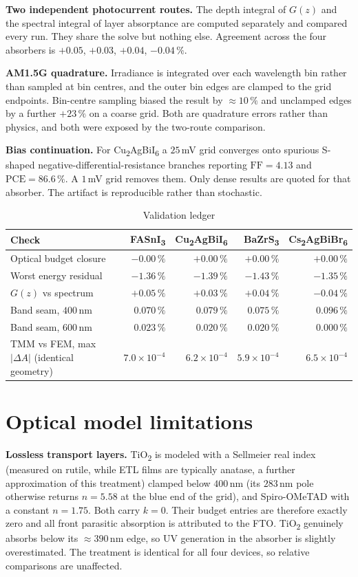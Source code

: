 \documentclass[lettersize,journal,onecolumn]{IEEEtran}
\newcommand{\FASnI}{FASnI\textsubscript{3}}
\newcommand{\CABI}{Cu\textsubscript{2}AgBiI\textsubscript{6}}
\newcommand{\BZS}{BaZrS\textsubscript{3}}
\newcommand{\CABB}{Cs\textsubscript{2}AgBiBr\textsubscript{6}}
\newcommand{\TiOx}{TiO\textsubscript{2}}
\begin{document}
\textbf{Two independent photocurrent routes.} The depth integral of $G(z)$ and
the spectral integral of layer absorptance are computed separately and
compared every run. They share the solve but nothing else. Agreement across
the four absorbers is $+0.05$, $+0.03$, $+0.04$, $-0.04\,\%$.

\textbf{AM1.5G quadrature.} Irradiance is integrated over each wavelength bin
rather than sampled at bin centres, and the outer bin edges are clamped to the
grid endpoints. Bin-centre sampling biased the result by $\approx10\,\%$ and
unclamped edges by a further $+23\,\%$ on a coarse grid. Both are quadrature
errors rather than physics, and both were exposed by the two-route comparison.

\textbf{Bias continuation.} For \CABI{} a $25\,$mV grid converges onto spurious
S-shaped negative-differential-resistance branches reporting $\mathrm{FF}=4.13$
and $\mathrm{PCE}=86.6\,\%$. A $1\,$mV grid removes them. Only dense results
are quoted for that absorber. The artifact is reproducible rather than
stochastic.

\begin{table}[!ht]
\caption{Validation ledger}
\centering\small
\begin{tabular}{lrrrr}
\toprule
Check & \FASnI & \CABI & \BZS & \CABB \\
\midrule
Optical budget closure       & $-0.00\,\%$ & $+0.00\,\%$ & $+0.00\,\%$ & $+0.00\,\%$ \\
Worst energy residual        & $-1.36\,\%$ & $-1.39\,\%$ & $-1.43\,\%$ & $-1.35\,\%$ \\
$G(z)$ vs spectrum           & $+0.05\,\%$ & $+0.03\,\%$ & $+0.04\,\%$ & $-0.04\,\%$ \\
Band seam, $400\,$nm         & $0.070\,\%$ & $0.079\,\%$ & $0.075\,\%$ & $0.096\,\%$ \\
Band seam, $600\,$nm         & $0.023\,\%$ & $0.020\,\%$ & $0.020\,\%$ & $0.000\,\%$ \\
TMM vs FEM, max $|\Delta A|$ (identical geometry) & $7.0\times10^{-4}$ & $6.2\times10^{-4}$ & $5.9\times10^{-4}$ & $6.5\times10^{-4}$ \\
\bottomrule
\end{tabular}
\end{table}

\section{Optical model limitations}
\textbf{Lossless transport layers.} \TiOx{} is modeled with a Sellmeier real
index (measured on rutile, while ETL films are typically anatase, a further
approximation of this treatment) clamped below $400\,$nm (its $283\,$nm pole otherwise returns $n=5.58$
at the blue end of the grid), and Spiro-OMeTAD with a constant $n=1.75$. Both
carry $k=0$. Their budget entries are therefore exactly zero and all front
parasitic absorption is attributed to the FTO. \TiOx{} genuinely absorbs below
its $\approx390\,$nm edge, so UV generation in the absorber is slightly
overestimated. The treatment is identical for all four devices, so relative
comparisons are unaffected.
\end{document}
